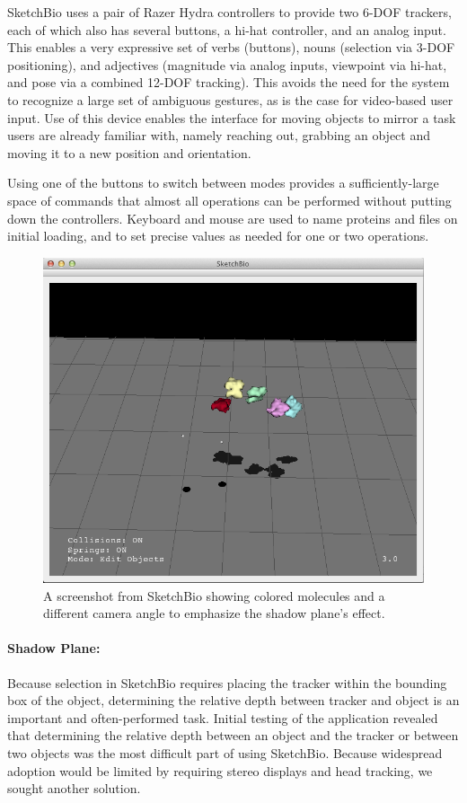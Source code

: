 \documentclass[twocolumn]{bmcart}%
\begin{document}
SketchBio uses a pair of Razer Hydra controllers to provide two 6-DOF trackers, each of which also has several buttons, a hi-hat controller, and an analog input.
This enables a very expressive set of verbs (buttons), nouns (selection via 3-DOF positioning), and adjectives (magnitude via analog inputs, viewpoint via hi-hat, and pose via a combined 12-DOF tracking).
This avoids the need for the system to recognize a large set of ambiguous gestures, as is the case for video-based user input.
Use of this device enables the interface for moving objects to mirror a task users are already familiar with, namely reaching out, grabbing an object and moving it to a new position and orientation.

Using one of the buttons to switch between modes provides a sufficiently-large space of commands that almost all operations can be performed without putting down the controllers.
Keyboard and mouse are used to name proteins and files on initial loading, and to set precise values as needed for one or two operations.

\begin{figure}[h]
\centering
\includegraphics[width=0.9\columnwidth]{shadow_plane.png}
\caption{A screenshot from SketchBio showing colored molecules and a different camera angle to emphasize the shadow plane's effect.}
\label{fig:shadow_plane}
\end{figure}

\paragraph*{Shadow Plane:}
Because selection in SketchBio requires placing the tracker within the bounding box of the object, determining the relative depth between tracker and object is an important and often-performed task.
Initial testing of the application revealed that determining the relative depth between an object and the tracker or between two objects was the most difficult part of using SketchBio.
Because widespread adoption would be limited by requiring stereo displays and head tracking, we sought another solution.
\end{document}

